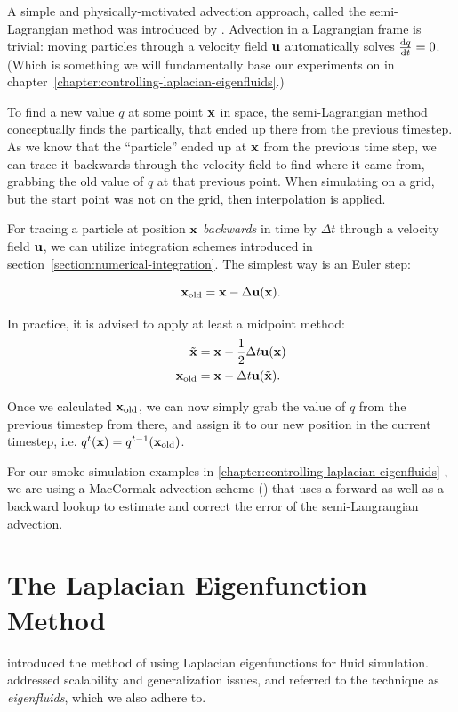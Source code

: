 A simple and physically-motivated advection approach, called the semi-Lagrangian
method was introduced by \cite{StableFluids}.  Advection in a Lagrangian frame
is trivial: moving particles through a velocity field $\vb{u}$ automatically
solves $\dv{q}{t} = 0$. (Which is something we will fundamentally base our
experiments on in chapter~\ref{chapter:controlling-laplacian-eigenfluids}.) 

To find a new value $q$ at some point $\vb{x}$ in space, the semi-Lagrangian
method conceptually finds the partically, that ended up there from the previous
timestep. As we know that the ``particle'' ended up at $\vb{x}$ from the previous
time step, we can trace it backwards through the velocity field to find where it
came from, grabbing the old value of $q$ at that previous point. When simulating
on a grid, but the start point was not on the grid, then interpolation is
applied.

For tracing a particle at position $\vb{x}$ \textit{backwards} in time by
$\Delta t$ through a velocity field $\vb{u}$, we can utilize integration schemes
introduced in section~\ref{section:numerical-integration}.  The simplest way is
an Euler step: 

$$\vb{x}_{\text{old}} = \vb{x} - \Delta \vb{u}(\vb{x}).$$

In practice, it is advised to apply at least a midpoint method: 
\begin{align*}
    \tilde{\vb{x}} &= \vb{x} - \frac{1}{2}\Delta t \vb{u}(\vb{x})\\
    \vb{x}_{\text{old}} &= \vb{x} - \Delta t \vb{u}(\tilde{\vb{x}}).
\end{align*}

Once we calculated $\vb{x}_{\text{old}}$, we can now simply grab the value of
$q$ from the previous timestep from there, and assign it to our new position in
the current timestep, i.e. $q^{t}(\vb{x}) = q^{t-1}(\vb{x}_{\text{old}})$.

For our smoke simulation examples in
\ref{chapter:controlling-laplacian-eigenfluids} , we are using a MacCormak
advection scheme (\cite{maccormack}) that uses a forward as well as a backward
lookup to estimate and correct the error of the semi-Langrangian advection.

\section{The Laplacian Eigenfunction Method}
\label{section:laplacian-eigenfluids}
\cite{dewitt} introduced the method of using Laplacian eigenfunctions for fluid
simulation. \cite{scalable-eigenfluids} addressed scalability and generalization
issues, and referred to the technique as \textit{eigenfluids}, which we also
adhere to.

